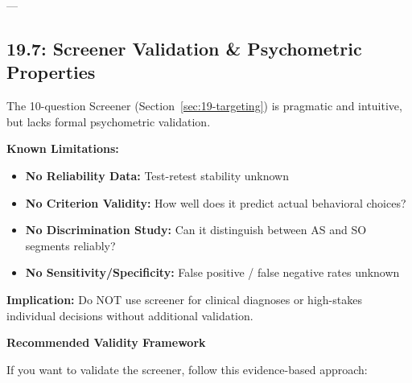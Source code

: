 ---

\subsection{19.7: Screener Validation \& Psychometric Properties}
\label{subsec:19-screener-validation}

\begin{tcolorbox}[colback=red!5!white, colframe=red!75!black, title=\textbf{Limitation Disclosure: The Screener has NOT been formally validated}]

The 10-question Screener (Section~\ref{sec:19-targeting}) is pragmatic and intuitive, but lacks formal psychometric validation.

\textbf{Known Limitations:}
\begin{itemize}[nosep]
\item \textbf{No Reliability Data:} Test-retest stability unknown
\item \textbf{No Criterion Validity:} How well does it predict actual behavioral choices?
\item \textbf{No Discrimination Study:} Can it distinguish between AS and SO segments reliably?
\item \textbf{No Sensitivity/Specificity:} False positive / false negative rates unknown
\end{itemize}

\textbf{Implication:} Do NOT use screener for clinical diagnoses or high-stakes individual decisions without additional validation.

\end{tcolorbox}

\textbf{Recommended Validity Framework}

If you want to validate the screener, follow this evidence-based approach:

